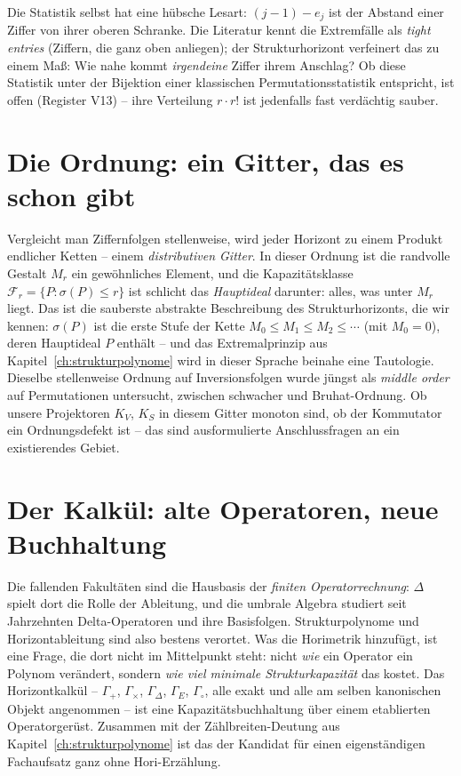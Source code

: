 Die Statistik selbst hat eine hübsche Lesart: $(j{-}1)-e_j$ ist der
Abstand einer Ziffer von ihrer oberen Schranke. Die Literatur kennt
die Extremfälle als \emph{tight entries} (Ziffern, die ganz oben
anliegen); der Strukturhorizont verfeinert das zu einem Maß: Wie
nahe kommt \emph{irgendeine} Ziffer ihrem Anschlag? Ob diese
Statistik unter der Bijektion einer klassischen
Permutationsstatistik entspricht, ist offen (Register V13) -- ihre
Verteilung $r\cdot r!$ ist jedenfalls fast verdächtig sauber.

\section{Die Ordnung: ein Gitter, das es schon gibt}

Vergleicht man Ziffernfolgen stellenweise, wird jeder Horizont zu
einem Produkt endlicher Ketten -- einem \emph{distributiven
Gitter}. In dieser Ordnung ist die randvolle Gestalt $M_r$ ein
gewöhnliches Element, und die Kapazitätsklasse
$\mathcal F_r=\{P:\sigma(P)\le r\}$ ist schlicht das
\emph{Hauptideal} darunter: alles, was unter $M_r$ liegt. Das ist
die sauberste abstrakte Beschreibung des Strukturhorizonts, die wir
kennen: $\sigma(P)$ ist die erste Stufe der Kette
$M_0\le M_1\le M_2\le\cdots$ (mit $M_0=0$), deren Hauptideal $P$
enthält -- und
das Extremalprinzip aus Kapitel~\ref{ch:strukturpolynome} wird in
dieser Sprache beinahe eine Tautologie. Dieselbe stellenweise
Ordnung auf Inversionsfolgen wurde jüngst als \emph{middle order}
auf Permutationen untersucht, zwischen schwacher und
Bruhat-Ordnung. Ob unsere Projektoren $K_V$, $K_S$ in diesem Gitter
monoton sind, ob der Kommutator ein Ordnungsdefekt ist -- das sind
ausformulierte Anschlussfragen an ein existierendes Gebiet.

\section{Der Kalkül: alte Operatoren, neue Buchhaltung}

Die fallenden Fakultäten sind die Hausbasis der
\emph{finiten Operatorrechnung}: $\Delta$ spielt dort die Rolle der
Ableitung, und die umbrale Algebra studiert seit Jahrzehnten
Delta-Operatoren und ihre Basisfolgen. Strukturpolynome und
Horizontableitung sind also bestens verortet. Was die Horimetrik
hinzufügt, ist eine Frage, die dort nicht im Mittelpunkt steht:
nicht \emph{wie} ein Operator ein Polynom verändert, sondern
\emph{wie viel minimale Strukturkapazität} das kostet. Das
Horizontkalkül -- $\Gamma_+$, $\Gamma_\times$, $\Gamma_\Delta$,
$\Gamma_E$, $\Gamma_\circ$, alle exakt und alle am selben
kanonischen Objekt angenommen -- ist eine Kapazitätsbuchhaltung
über einem etablierten Operatorgerüst. Zusammen mit der
Zählbreiten-Deutung aus Kapitel~\ref{ch:strukturpolynome} ist das
der Kandidat für einen eigenständigen Fachaufsatz ganz ohne
Hori-Erzählung.

